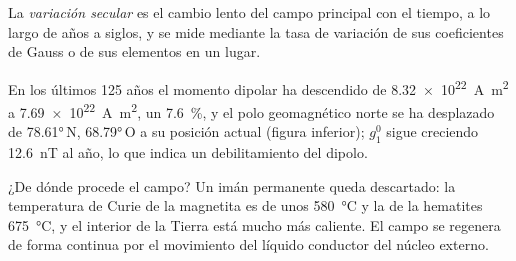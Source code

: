 \begin{definition}\label{def:b3:palaeomagnetism:secular}
La \emph{variación secular} es el cambio lento del
campo principal con el tiempo, a lo largo de años a siglos, y se mide mediante la
tasa de variación de sus coeficientes de Gauss o de sus elementos en un lugar.
\end{definition}

En los últimos 125 años el momento dipolar ha descendido de
\qty{8.32e22}{A.m^2} a \qty{7.69e22}{A.m^2}, un \qty{7.6}{\percent}, y el polo geomagnético norte
se ha desplazado de \ang{78.61}\,N, \ang{68.79}\,O a su posición actual
(figura inferior); $g_1^0$ sigue creciendo \qty{12.6}{nT} al año, lo que
indica un debilitamiento del dipolo.

\begin{omfigure}

\par{}\label{fig:b3:palaeomagnetism:dipole}
\end{omfigure}

¿De dónde procede el campo? Un imán permanente queda descartado: la temperatura de Curie
de la magnetita es de unos \qty{580}{\celsius} y la de la hematites
\qty{675}{\celsius}, y el interior de la Tierra está mucho más caliente. El campo
se regenera de forma continua por el movimiento del líquido conductor del núcleo
externo.

